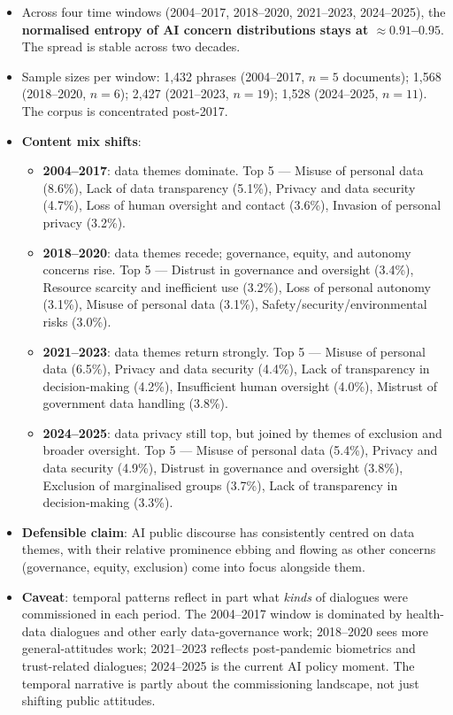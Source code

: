 \documentclass[11pt, a4paper]{article}
\begin{document}
\begin{itemize}
\item Across four time windows (2004--2017, 2018--2020, 2021--2023,
      2024--2025), the \textbf{normalised entropy of AI concern
      distributions stays at $\approx 0.91$--$0.95$}.  The spread is
      stable across two decades.
\item Sample sizes per window: 1,432 phrases (2004--2017, $n=5$
      documents); 1,568 (2018--2020, $n=6$); 2,427 (2021--2023,
      $n=19$); 1,528 (2024--2025, $n=11$).  The corpus is concentrated
      post-2017.
\item \textbf{Content mix shifts}:
      \begin{itemize}
      \item \textbf{2004--2017}: data themes dominate.  Top 5 ---
            Misuse of personal data (8.6\%), Lack of data transparency
            (5.1\%), Privacy and data security (4.7\%), Loss of human
            oversight and contact (3.6\%), Invasion of personal privacy
            (3.2\%).
      \item \textbf{2018--2020}: data themes recede; governance, equity,
            and autonomy concerns rise.  Top 5 --- Distrust in governance
            and oversight (3.4\%), Resource scarcity and inefficient use
            (3.2\%), Loss of personal autonomy (3.1\%), Misuse of
            personal data (3.1\%), Safety/security/environmental risks
            (3.0\%).
      \item \textbf{2021--2023}: data themes return strongly.  Top 5 ---
            Misuse of personal data (6.5\%), Privacy and data security
            (4.4\%), Lack of transparency in decision-making (4.2\%),
            Insufficient human oversight (4.0\%), Mistrust of government
            data handling (3.8\%).
      \item \textbf{2024--2025}: data privacy still top, but joined by
            themes of exclusion and broader oversight.  Top 5 --- Misuse
            of personal data (5.4\%), Privacy and data security (4.9\%),
            Distrust in governance and oversight (3.8\%), Exclusion of
            marginalised groups (3.7\%), Lack of transparency in
            decision-making (3.3\%).
      \end{itemize}
\item \textbf{Defensible claim}: AI public discourse has consistently
      centred on data themes, with their relative prominence ebbing and
      flowing as other concerns (governance, equity, exclusion) come into
      focus alongside them.
\item \textbf{Caveat}: temporal patterns reflect in part what
      \emph{kinds} of dialogues were commissioned in each period.  The
      2004--2017 window is dominated by health-data dialogues and other
      early data-governance work; 2018--2020 sees more general-attitudes
      work; 2021--2023 reflects post-pandemic biometrics and
      trust-related dialogues; 2024--2025 is the current AI policy
      moment.  The temporal narrative is partly about the commissioning
      landscape, not just shifting public attitudes.
\end{itemize}
\end{document}
